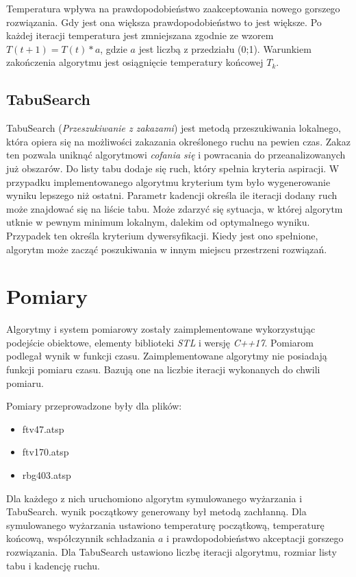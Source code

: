\documentclass[12pt]{article}
\begin{document}
Temperatura wpływa na prawdopodobieństwo zaakceptowania nowego gorszego rozwiązania. Gdy jest ona większa prawdopodobieństwo to jest większe. Po każdej iteracji temperatura jest zmniejszana zgodnie ze wzorem $T(t+1)=T(t)*a$, gdzie $a$ jest liczbą z przedziału (0;1). Warunkiem zakończenia algorytmu jest osiągnięcie temperatury końcowej $T_k$.

\subsection{TabuSearch}
TabuSearch (\textit{Przeszukiwanie z zakazami}) jest metodą przeszukiwania lokalnego, która opiera się na możliwości zakazania określonego ruchu na pewien czas.
Zakaz ten pozwala uniknąć algorytmowi \textit{cofania się} i powracania do przeanalizowanych już obszarów.
Do listy tabu dodaje się ruch, który spełnia kryteria aspiracji. W przypadku implementowanego algorytmu kryterium tym było wygenerowanie wyniku lepszego niż ostatni. Parametr kadencji określa ile iteracji dodany ruch może znajdować się na liście tabu.
Może zdarzyć się sytuacja, w której algorytm utknie w pewnym minimum lokalnym, dalekim od optymalnego wyniku. Przypadek ten określa kryterium dywersyfikacji. Kiedy jest ono spełnione, algorytm może zacząć poszukiwania w innym miejscu przestrzeni rozwiązań.


\section{Pomiary}
Algorytmy i system pomiarowy zostały zaimplementowane wykorzystując podejście obiektowe, elementy biblioteki \textit{STL} i wersję \textit{C++17}.
Pomiarom podlegał wynik w funkcji czasu. Zaimplementowane algorytmy nie posiadają funkcji pomiaru czasu. Bazują one na liczbie iteracji wykonanych do chwili pomiaru.

Pomiary przeprowadzone były dla plików:
\begin{itemize}[noitemsep]
    \item ftv47.atsp
    \item ftv170.atsp
    \item rbg403.atsp
\end{itemize}
Dla każdego z nich uruchomiono algorytm symulowanego wyżarzania i TabuSearch. wynik początkowy generowany był metodą zachłanną.
Dla symulowanego wyżarzania ustawiono temperaturę początkową, temperaturę końcową, współczynnik schładzania $a$ i prawdopodobieństwo akceptacji gorszego rozwiązania.
Dla TabuSearch ustawiono liczbę iteracji algorytmu, rozmiar listy tabu i kadencję ruchu.
\clearpage
\end{document}

